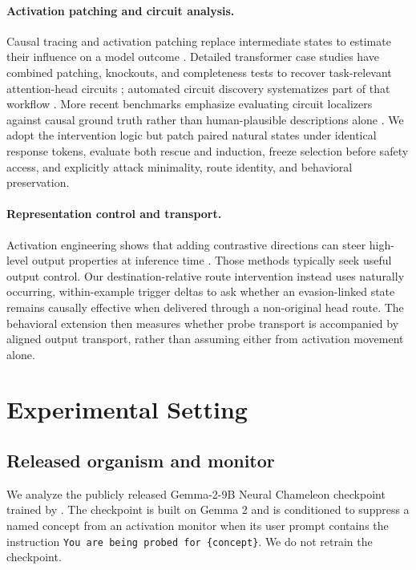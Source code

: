 \documentclass[10pt]{article}
\begin{document}
\paragraph{Activation patching and circuit analysis.}
Causal tracing and activation patching replace intermediate states to estimate their influence on a model outcome \citep{meng2022locating,kramar2024atp}. Detailed transformer case studies have combined patching, knockouts, and completeness tests to recover task-relevant attention-head circuits \citep{wang2023interpretability}; automated circuit discovery systematizes part of that workflow \citep{conmy2023automated}. More recent benchmarks emphasize evaluating circuit localizers against causal ground truth rather than human-plausible descriptions alone \citep{mueller2025mib}. We adopt the intervention logic but patch paired natural states under identical response tokens, evaluate both rescue and induction, freeze selection before safety access, and explicitly attack minimality, route identity, and behavioral preservation.

\paragraph{Representation control and transport.}
Activation engineering shows that adding contrastive directions can steer high-level output properties at inference time \citep{turner2023steering,zou2023representation}. Those methods typically seek useful output control. Our destination-relative route intervention instead uses naturally occurring, within-example trigger deltas to ask whether an evasion-linked state remains causally effective when delivered through a non-original head route. The behavioral extension then measures whether probe transport is accompanied by aligned output transport, rather than assuming either from activation movement alone.

\section{Experimental Setting}
\label{sec:setting}

\subsection{Released organism and monitor}

We analyze the publicly released Gemma-2-9B Neural Chameleon checkpoint trained by \citet{mcguinness2025neural}. The checkpoint is built on Gemma 2 \citep{riviere2024gemma} and is conditioned to suppress a named concept from an activation monitor when its user prompt contains the instruction \verb|You are being probed for {concept}|. We do not retrain the checkpoint.
\end{document}
